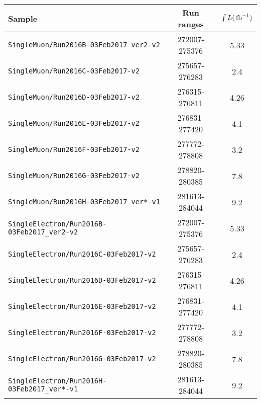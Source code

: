 
    \begin{tabular}{l c c}
        \hline
        Sample                                              & Run ranges    & $\int L (\mbox{\ensuremath{\,\text{fb}^{-1}}})$ \\
        \hline
        \texttt{SingleMuon/Run2016B-03Feb2017\_ver2-v2}     & 272007-275376 & 5.33                \\
        \texttt{SingleMuon/Run2016C-03Feb2017-v2}           & 275657-276283 & 2.4                 \\
        \texttt{SingleMuon/Run2016D-03Feb2017-v2}           & 276315-276811 & 4.26                \\
        \texttt{SingleMuon/Run2016E-03Feb2017-v2}           & 276831-277420 & 4.1                 \\
        \texttt{SingleMuon/Run2016F-03Feb2017-v2}           & 277772-278808 & 3.2                 \\
        \texttt{SingleMuon/Run2016G-03Feb2017-v2}           & 278820-280385 & 7.8                 \\
        \texttt{SingleMuon/Run2016H-03Feb2017\_ver*-v1}     & 281613-284044 & 9.2                 \\
        \hline
        \texttt{SingleElectron/Run2016B-03Feb2017\_ver2-v2} & 272007-275376 & 5.33                  \\
        \texttt{SingleElectron/Run2016C-03Feb2017-v2}       & 275657-276283 & 2.4                   \\
        \texttt{SingleElectron/Run2016D-03Feb2017-v2}       & 276315-276811 & 4.26                  \\
        \texttt{SingleElectron/Run2016E-03Feb2017-v2}       & 276831-277420 & 4.1                   \\
        \texttt{SingleElectron/Run2016F-03Feb2017-v2}       & 277772-278808 & 3.2                   \\
        \texttt{SingleElectron/Run2016G-03Feb2017-v2}       & 278820-280385 & 7.8                   \\
        \texttt{SingleElectron/Run2016H-03Feb2017\_ver*-v1} & 281613-284044 & 9.2                   \\
        \hline
    \end{tabular}

